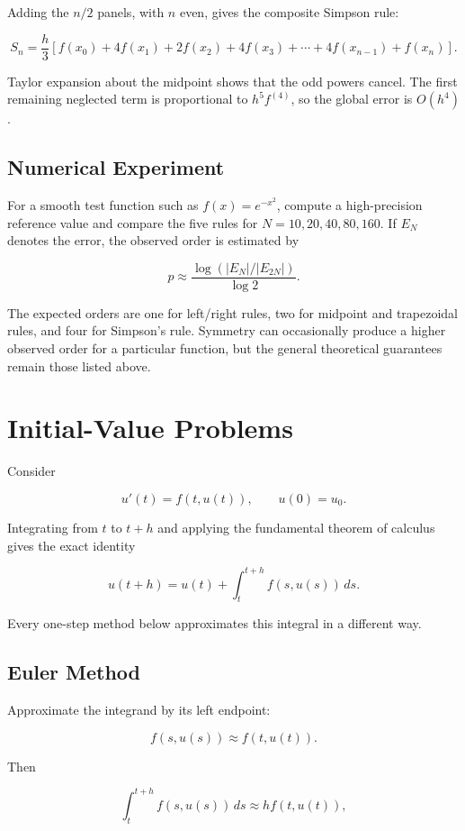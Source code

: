\documentclass[12pt, a4paper]{article}
\theoremstyle{break}
\begin{document}
Adding the \(n/2\) panels, with \(n\) even, gives the composite Simpson rule:

\[
S_n=\frac h3\left[f(x_0)+4f(x_1)+2f(x_2)+4f(x_3)+\cdots+4f(x_{n-1})+f(x_n)\right].
\]

Taylor expansion about the midpoint shows that the odd powers cancel. The first remaining neglected term is proportional to \(h^5f^{(4)}\), so the global error is \(O(h^4)\).

\subsection{Numerical Experiment}\label{numerical-experiment}

For a smooth test function such as \(f(x)=e^{-x^2}\), compute a high-precision reference value and compare the five rules for \(N=10,20,40,80,160\). If \(E_N\) denotes the error, the observed order is estimated by

\[
p\approx\frac{\log(|E_N|/|E_{2N}|)}{\log 2}.
\]

The expected orders are one for left/right rules, two for midpoint and trapezoidal rules, and four for Simpson's rule. Symmetry can occasionally produce a higher observed order for a particular function, but the general theoretical guarantees remain those listed above.

\section{Initial-Value Problems}\label{initial-value-problems}

Consider

\[
u'(t)=f(t,u(t)),\qquad u(0)=u_0.
\]

Integrating from \(t\) to \(t+h\) and applying the fundamental theorem of calculus gives the exact identity

\[
u(t+h)=u(t)+\int_t^{t+h}f(s,u(s))\,ds.
\]

Every one-step method below approximates this integral in a different way.

\subsection{Euler Method}\label{euler-method}

Approximate the integrand by its left endpoint:

\[
f(s,u(s))\approx f(t,u(t)).
\]

Then

\[
\int_t^{t+h}f(s,u(s))\,ds\approx hf(t,u(t)),
\]
\end{document}
